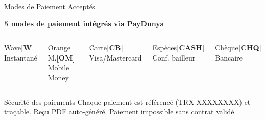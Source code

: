 ﻿\documentclass[aspectratio=169,10pt]{beamer}
\newcommand{\kcblue}[1]{\textcolor{kcIndigo}{\textbf{#1}}}
\begin{document}
\begin{frame}{Modes de Paiement Accept\'{e}s}
\begin{center}\large\kcblue{5 modes de paiement int\'{e}gr\'{e}s via PayDunya}\end{center}
\vspace{0.3cm}
\begin{columns}[T]
\begin{block}{\centering Wave}\centering\textbf{[W]}\\Instantan\'{e}\end{block}
\begin{block}{\centering Orange M.}\centering\textbf{[OM]}\\Mobile Money\end{block}
\begin{block}{\centering Carte}\centering\textbf{[CB]}\\Visa/Mastercard\end{block}
\begin{block}{\centering Esp\`{e}ces}\centering\textbf{[CASH]}\\Conf. bailleur\end{block}
\begin{block}{\centering Ch\`{e}que}\centering\textbf{[CHQ]}\\Bancaire\end{block}
\end{columns}
\vspace{0.4cm}
\begin{alertblock}{\centering S\'{e}curit\'{e} des paiements}
\centering Chaque paiement est r\'{e}f\'{e}renc\'{e} (TRX-XXXXXXXX) et tra\c{c}able. Re\c{c}u PDF auto-g\'{e}n\'{e}r\'{e}. Paiement impossible sans contrat valid\'{e}.
\end{alertblock}
\end{frame}
\end{document}
